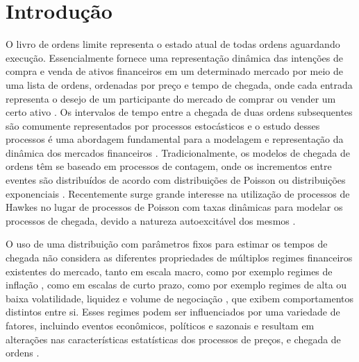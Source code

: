\chapter{Introdução}

O livro de ordens limite representa o estado atual de todas ordens aguardando execução. Essencialmente fornece uma representação dinâmica das intenções de compra e venda de ativos financeiros em um determinado mercado por meio de uma lista de ordens, ordenadas por preço e tempo de chegada, onde cada entrada representa o desejo de um participante do mercado de comprar ou vender um certo ativo \citep{Abergel2020, Avellaneda2008}. Os intervalos de tempo entre a chegada de duas ordens subsequentes são comumente representados por processos estocásticos e o estudo desses processos é uma abordagem fundamental para a modelagem e representação da dinâmica dos mercados financeiros \citep{Shi2022, Guilbaud2013, Liu2021}. Tradicionalmente, os modelos de chegada de ordens têm se baseado em processos de contagem, onde os incrementos entre eventes são distribuídos de acordo com distribuições de Poisson ou distribuições exponenciais \citep{Cont2022, Ponta2012}. Recentemente surge grande interesse na utilização de processos de Hawkes no lugar de processos de Poisson com taxas dinâmicas para modelar os processos de chegada, devido a natureza autoexcitável dos mesmos \citep{Abergel2020, MorariuPatrichi2022, Toke2011}. 

O uso de uma distribuição com parâmetros fixos para estimar os tempos de chegada não considera as diferentes propriedades de múltiplos regimes financeiros existentes do mercado, tanto em escala macro, como por exemplo regimes de inflação \citep{Krause2022}, como em escalas de curto prazo, como por exemplo regimes de alta ou baixa volatilidade, liquidez e volume de negociação \citep{Guilbaud2013}, que exibem comportamentos distintos entre si. Esses regimes podem ser influenciados por uma variedade de fatores, incluindo eventos econômicos, políticos e sazonais e resultam em alterações nas características estatísticas dos processos de preços, e chegada de ordens \citep{Krause2022}.

